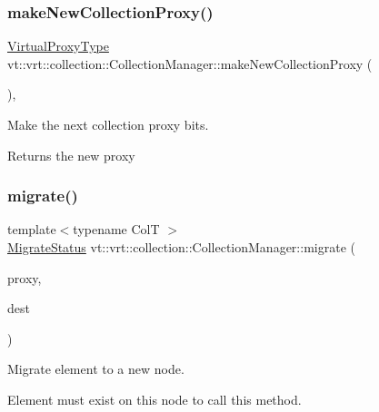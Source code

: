 \subsubsection{\texorpdfstring{make\+New\+Collection\+Proxy()}{makeNewCollectionProxy()}}
{\footnotesize\ttfamily \hyperlink{namespacevt_a1b417dd5d684f045bb58a0ede70045ac}{Virtual\+Proxy\+Type} vt\+::vrt\+::collection\+::\+Collection\+Manager\+::make\+New\+Collection\+Proxy (\begin{DoxyParamCaption}{ }\end{DoxyParamCaption})\hspace{0.3cm}{\ttfamily [inline]}, {\ttfamily [protected]}}



Make the next collection proxy bits. 

\begin{DoxyReturn}{Returns}
the new proxy 
\end{DoxyReturn}
\mbox{\label{structvt_1_1vrt_1_1collection_1_1_collection_manager_aa78b0230c093abfbfc42629f36047c52}} 
\subsubsection{\texorpdfstring{migrate()}{migrate()}}
{\footnotesize\ttfamily template$<$typename ColT $>$ \\
\hyperlink{namespacevt_1_1vrt_1_1collection_ad221ad8aea9e586689b4335f5bcd9804}{Migrate\+Status} vt\+::vrt\+::collection\+::\+Collection\+Manager\+::migrate (\begin{DoxyParamCaption}\item[{\hyperlink{structvt_1_1vrt_1_1collection_1_1_vrt_elm_proxy}{Vrt\+Elm\+Proxy}$<$ ColT, typename Col\+T\+::\+Index\+Type $>$}]{proxy,  }\item[{\hyperlink{namespacevt_a866da9d0efc19c0a1ce79e9e492f47e2}{Node\+Type} const \&}]{dest }\end{DoxyParamCaption})}



Migrate element to a new node. 

Element must exist on this node to call this method.


